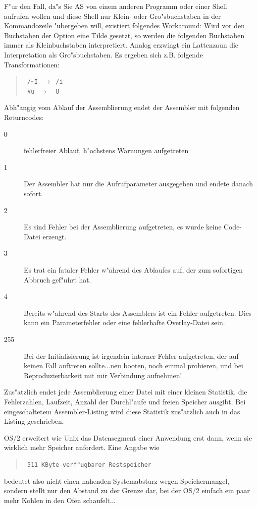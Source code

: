 \documentclass[12pt,a4paper,twoside]{report}
\newcommand{\asname}{AS}
\begin{document}
\par
F"ur den Fall, da"s Sie \asname{} von einem anderen Programm oder einer Shell
aufrufen wollen und diese Shell nur Klein- oder Gro"sbuchstaben in der
Kommandozeile "ubergeben will, existiert folgendes Workaround: Wird vor
den Buchstaben der Option eine Tilde gesetzt, so werden die folgenden
Buchstaben immer als Kleinbuchstaben interpretiert.  Analog erzwingt
ein Lattenzaun die Interpretation als Gro"sbuchstaben.  Es ergeben
sich z.B. folgende Transformationen:
\begin{quote}{\tt
 /\verb!~!I $\longrightarrow$ /i \\
 -\verb!#!u $\longrightarrow$ -U}
\end{quote}
\par
Abh"angig vom Ablauf der Assemblierung endet der Assembler mit
folgenden Returncodes:
\begin{description}
\item[0]{fehlerfreier Ablauf, h"ochstens Warnungen aufgetreten}
\item[1]{Der Assembler hat nur die Aufrufparameter ausgegeben und
         endete danach sofort.}
\item[2]{Es sind Fehler bei der Assemblierung aufgetreten, es wurde
         keine Code-Datei erzeugt.}
\item[3]{Es trat ein fataler Fehler w"ahrend des Ablaufes auf, der
         zum sofortigen Abbruch gef"uhrt hat.}
\item[4]{Bereits w"ahrend des Starts des Assemblers ist ein Fehler
         aufgetreten.  Dies kann ein Parameterfehler oder eine fehlerhafte
         Overlay-Datei sein.}
\item[255]{Bei der Initialisierung ist irgendein interner Fehler
         aufgetreten, der auf keinen Fall auftreten sollte...neu booten,
         noch einmal probieren, und bei Reproduzierbarkeit mit mir
         Verbindung aufnehmen!}
\end{description}

Zus"atzlich endet jede Assemblierung einer Datei mit einer kleinen
Statistik, die Fehlerzahlen, Laufzeit, Anzahl der Durchl"aufe und freien
Speicher ausgibt.  Bei eingeschaltetem Assembler-Listing wird diese
Statistik zus"atzlich auch in das Listing geschrieben.

OS/2  erweitert wie Unix das Datensegment einer
Anwendung erst dann, wenn sie wirklich mehr Speicher anfordert.  Eine
Angabe wie
\begin{quote}{\tt
511 KByte verf"ugbarer Restspeicher
}\end{quote}
bedeutet also nicht einen nahenden Systemabsturz wegen Speichermangel,
sondern stellt nur den Abstand zu der Grenze dar, bei der OS/2 einfach
ein paar mehr Kohlen in den Ofen schaufelt...
\end{document}
